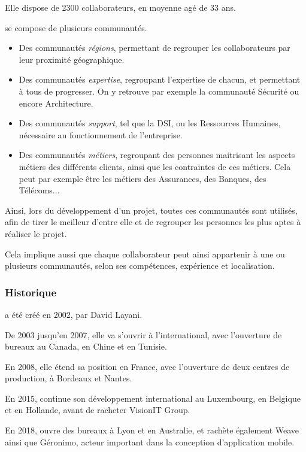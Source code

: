 Elle dispose de 2300 collaborateurs, en moyenne agé de 33 ans.

\xmakefirstuc{\onepoint{}} se compose de plusieurs communautés.

\begin{itemize}
	\item Des communautés \emph{régions}, permettant de regrouper les collaborateurs par leur proximité géographique.
	\item Des communautés \emph{expertise}, regroupant l'expertise de chacun, et permettant à tous de progresser. On y retrouve par exemple la communauté Sécurité ou encore Architecture.
	\item Des communautés \emph{support}, tel que la \gls{DSI}, ou les Ressources Humaines, nécessaire au fonctionnement de l'entreprise.
	\item Des communautés \emph{métiers}, regroupant des personnes maitrisant les aspects métiers des différents clients, ainsi que les contraintes de ces métiers. Cela peut par exemple être les métiers des Assurances, des Banques, des Télécoms... 
\end{itemize}

Ainsi, lors du développement d'un projet, toutes ces communautés sont utilisés, afin de tirer le meilleur d'entre elle et de regrouper les personnes les plus aptes à réaliser le projet.

Cela implique aussi que chaque collaborateur peut ainsi appartenir à une ou plusieurs communautés, selon ses compétences, expérience et localisation.

\subsubsection{Historique} 

\xmakefirstuc{\onepoint{}} a été créé en 2002, par David Layani.

De 2003 jusqu'en 2007, elle va s'ouvrir à l'international, avec l'ouverture de bureaux au Canada, en Chine et en Tunisie.

En 2008, elle étend sa position en France, avec l'ouverture de deux centres de production, à Bordeaux et Nantes.

En 2015, \onepoint{} continue son développement international au Luxembourg, en Belgique et en Hollande, avant de racheter VisionIT Group.

En 2018, \onepoint{} ouvre des bureaux à Lyon et en Australie, et rachète également Weave ainsi que Géronimo, acteur important dans la conception d'application mobile.

